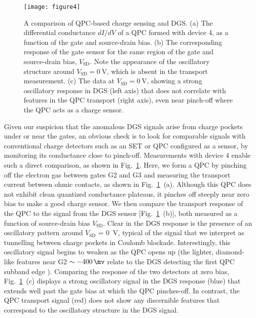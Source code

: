\begin{figure}
  \texttt{[image: figure4]}
  \caption[Comparison of QPC based charge sensing and dispersive gate sensing]{\label{fig:pock_fig4} A comparison of QPC-based charge sensing and DGS. (a) The differential conductance $dI/dV$ of a QPC formed with device 4, as a function of the gate and source-drain bias. (b) The corresponding response of the gate sensor for the same region of the gate and source-drain bias, $V_{\textrm{SD}}$. Note the appearance of the oscillatory structure around $V_{\textrm{SD}} = \SI{0}{\volt}$, which is absent in the transport measurement. (c) The data at  $V_{\textrm{SD}} = \SI{0}{\volt}$, showing a strong oscillatory response in DGS  (left axis) that does not correlate with features in the QPC transport (right axis), even near pinch-off where the QPC acts as a charge sensor.}
\end{figure}

Given our suspicion that the anomalous DGS signals arise from charge pockets under or near the gates, an obvious check is to look for comparable signals with conventional charge detectors such as an SET or QPC configured as a sensor, by monitoring its conductance close to pinch-off. Measurements with device 4 enable such a direct comparison, as shown in Fig.~\ref{fig:pock_fig4}. Here, we form a QPC by pinching off the electron gas between gates G2 and G3 and measuring the transport current between ohmic contacts, as shown in Fig.~\ref{fig:pock_fig4}~(a). Although this QPC does not exhibit clean quantized conductance plateaus, it pinches off steeply near zero bias to make a good charge sensor. We then compare the transport response of the QPC to the signal from the DGS sensor [Fig.~\ref{fig:pock_fig4}~(b)], both measured as a function of source-drain bias  $V_{\textrm{SD}}$. Clear in the DGS response is the presence of an oscillatory pattern around $V_{\textrm{SD}}$ = \SI{0}{\volt}, typical of the signal that we interpret as tunnelling between charge pockets in Coulomb blockade. Interestingly, this oscillatory signal begins to weaken as the QPC opens up (the lighter, diamond-like features near G2 $\sim \SI{-400}{\mv}$ relate to the DGS detecting the first QPC subband edge \cite{MC_paper}). Comparing the response of the two detectors at zero bias, Fig.~\ref{fig:pock_fig4}~(c) displays a strong oscillatory signal in the DGS response (blue) that extends well past the gate bias at which the QPC pinches-off. In contrast, the QPC transport signal (red) does not show any discernible features that correspond to the oscillatory structure in the DGS signal.


